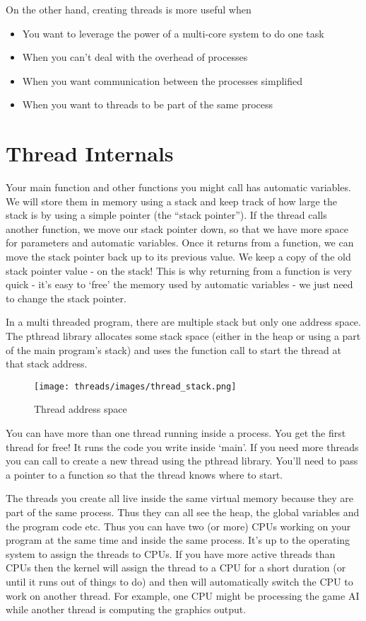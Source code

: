 On the other hand, creating threads is more useful when
\begin{itemize}
\item You want to leverage the power of a multi-core system to do one task
\item When you can't deal with the overhead of processes
\item When you want communication between the processes simplified
\item When you want to threads to be part of the same process
\end{itemize}

\section{Thread Internals}

Your main function and other functions you might call has automatic variables.
We will store them in memory using a stack and keep track of how large the stack is by using a simple pointer (the ``stack pointer'').
If the thread calls another function, we move our stack pointer down, so that we have more space for parameters and automatic variables.
Once it returns from a function, we can move the stack pointer back up to its previous value.
We keep a copy of the old stack pointer value - on the stack!
This is why returning from a function is very quick - it's easy to `free' the memory used by automatic variables - we just need to change the stack pointer.

In a multi threaded program, there are multiple stack but only one address space. The pthread library allocates some stack space (either in the heap or using a part of the main program's stack) and uses the  function call to start the thread at that stack address.

\begin{figure}[htbp]
\centering
\texttt{[image: threads/images/thread\_stack.png]}
\caption{Thread address space}
\end{figure}

You can have more than one thread running inside a process. You get the first thread for free! It runs the code you write inside `main'. If you need more threads you can call  to create a new thread using the pthread library. You'll need to pass a pointer to a function so that the thread knows where to start.

The threads you create all live inside the same virtual memory because they are part of the same process. Thus they can all see the heap, the global variables and the program code etc. Thus you can have two (or more) CPUs working on your program at the same time and inside the same process. It's up to the operating system to assign the threads to CPUs. If you have more active threads than CPUs then the kernel will assign the thread to a CPU for a short duration (or until it runs out of things to do) and then will automatically switch the CPU to work on another thread. For example, one CPU might be processing the game AI while another thread is computing the graphics output.

